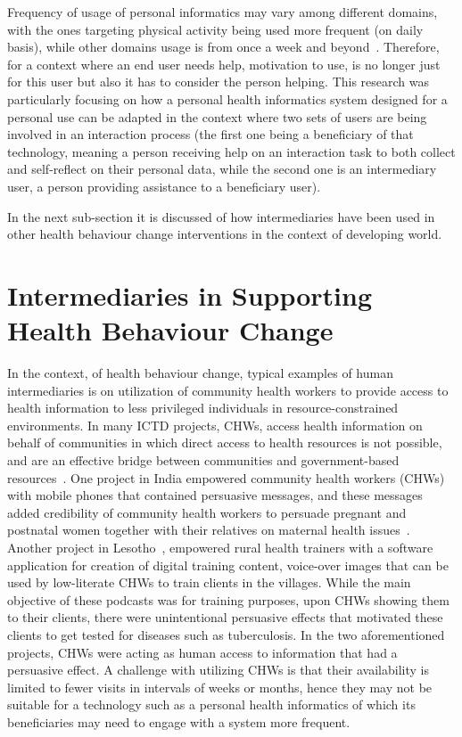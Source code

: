 Frequency of usage of personal informatics may vary among different domains, with the ones targeting physical activity being used more frequent (on daily basis), while other domains usage is from once a week and beyond~\citep{epstein2015lived}. Therefore, for a context where an end user needs help, motivation to use, is no longer just for this user but also it has to consider the person helping. This research was particularly focusing on how a personal health informatics system  designed for a personal use can be adapted in the context where two sets of users are being involved in an interaction process (the first one being a beneficiary of that technology, meaning a person receiving help on an interaction task to both collect and self-reflect on their personal data, while the second one is an intermediary user, a person providing assistance to a beneficiary user).  

In the next sub-section it is discussed of how intermediaries have been used in other health behaviour change interventions in the context of developing world.
\section{Intermediaries in Supporting Health Behaviour Change}
In the context, of health behaviour change, typical examples of human intermediaries is on utilization of community health workers to provide access to health information to less privileged individuals in resource-constrained environments.  In many ICTD projects, CHWs, access health information on behalf of communities in which direct access to health resources is not possible, and are an effective bridge between communities and government-based resources~\citep{katule2016leveraging}. One project in India empowered community health workers (CHWs) with mobile phones that contained persuasive messages, and these messages added credibility of community health workers to persuade pregnant and postnatal women together with their relatives on maternal health issues~\citep{ramachandran2010mobile,ramachandran2010research}. Another project in Lesotho~\citep{molapo2013software}, empowered rural health trainers with a software application for creation of digital  training  content, voice-over images  that can be used by low-literate CHWs to train clients in the villages. While the main objective of these podcasts was for training purposes, upon CHWs showing them to their clients, there were unintentional persuasive effects that motivated these clients to get tested for diseases such as tuberculosis. In the two aforementioned projects, CHWs were acting as human access to information that had a persuasive effect. A challenge with utilizing CHWs is that their availability is limited to fewer visits in intervals of weeks or months, hence they may not be suitable for a technology such as a personal health informatics of which its beneficiaries may need to engage with a system more frequent. 
